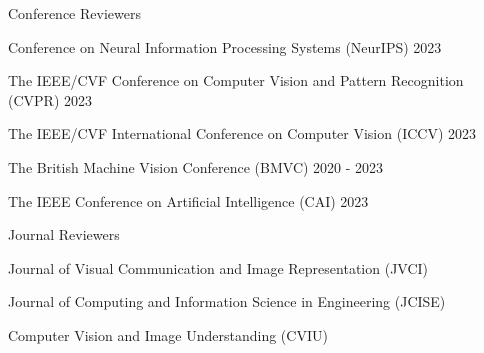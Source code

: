 


\begin{cventries}

\cvpub
{Conference Reviewers} %
{ %
\begin{cvitems}
    \item {Conference on Neural Information Processing Systems (NeurIPS) 2023}
    \item {The IEEE/CVF Conference on Computer Vision and Pattern Recognition (CVPR) 2023}
    \item {The IEEE/CVF International Conference on Computer Vision (ICCV) 2023}
    \item {The British Machine Vision Conference (BMVC) 2020 - 2023}
    \item {The IEEE Conference on Artificial Intelligence (CAI) 2023}
\end{cvitems}
}
\cvpub
{Journal Reviewers} %
{
\begin{cvitems}
    \item {Journal of Visual Communication and Image Representation (JVCI)}
    \item {Journal of Computing and Information Science in Engineering (JCISE)}
    \item {Computer Vision and Image Understanding (CVIU)}
\end{cvitems}
}
\end{cventries}

\vspace{.5em}

